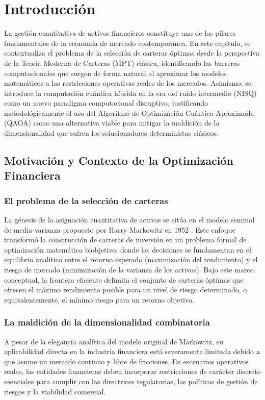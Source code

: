 \chapter{Introducción}
\label{ch:introduccion}

La gestión cuantitativa de activos financieros constituye uno de los pilares fundamentales de la economía de mercado contemporánea. En este capítulo, se contextualiza el problema de la selección de carteras óptimas desde la perspectiva de la Teoría Moderna de Carteras (MPT) clásica, identificando las barreras computacionales que surgen de forma natural al aproximar los modelos matemáticos a las restricciones operativas reales de los mercados. Asimismo, se introduce la computación cuántica híbrida en la era del ruido intermedio (NISQ) como un nuevo paradigma computacional disruptivo, justificando metodológicamente el uso del Algoritmo de Optimización Cuántica Aproximada (QAOA) como una alternativa viable para mitigar la maldición de la dimensionalidad que sufren los solucionadores deterministas clásicos.

\section{Motivación y Contexto de la Optimización Financiera}
\label{sec:motivacion_contexto}

\subsection{El problema de la selección de carteras}
La génesis de la asignación cuantitativa de activos se sitúa en el modelo seminal de media-varianza propuesto por Harry Markowitz en 1952 \cite{Markowitz1952}. Este enfoque transformó la construcción de carteras de inversión en un problema formal de optimización matemática biobjetivo, donde las decisiones se fundamentan en el equilibrio analítico entre el retorno esperado (maximización del rendimiento) y el riesgo de mercado (minimización de la varianza de los activos). Bajo este marco conceptual, la frontera eficiente delimita el conjunto de carteras óptimas que ofrecen el máximo rendimiento posible para un nivel de riesgo determinado, o equivalentemente, el mínimo riesgo para un retorno objetivo.

\subsection{La maldición de la dimensionalidad combinatoria}
A pesar de la elegancia analítica del modelo original de Markowitz, su aplicabilidad directa en la industria financiera está severamente limitada debido a que asume un mercado continuo y libre de fricciones. En escenarios operativos reales, las entidades financieras deben incorporar restricciones de carácter discreto esenciales para cumplir con las directrices regulatorias, las políticas de gestión de riesgos y la viabilidad comercial. 

